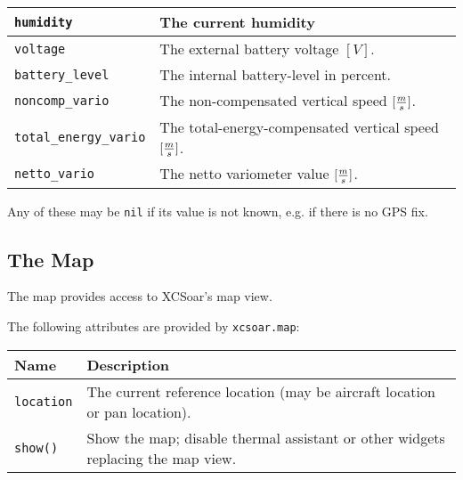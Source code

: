 \begin{maxipage}
\begin{tabularx}{1.9\textwidth}{l|X}
\hline

\verb|humidity| & The current humidity \\

\hline

\verb|voltage| & The external battery voltage
$[{V}]$. \\

\hline

\verb|battery_level| & The internal battery-level in percent. \\

\hline

\verb|noncomp_vario| & The non-compensated vertical speed
$[{m \over s}]$. \\

\hline

\verb|total_energy_vario| & The total-energy-compensated vertical speed
$[{m \over s}]$. \\

\hline

\verb|netto_vario| & The netto variometer value
$[{m \over s}]$. \\

\end{tabularx}
\end{maxipage}

Any of these may be \verb|nil| if its value is not known, e.g. if
there is no GPS fix.

\subsection{The Map}

The map provides access to XCSoar's map view.

The following attributes are provided by \verb|xcsoar.map|:

\begin{maxipage}
\begin{tabularx}{1.9\textwidth}{l|X}
Name & Description \\
\hline\hline

\verb|location| & The current reference location (may be aircraft location or
pan location). \\

\hline

\verb|show()| & Show the map; disable thermal assistant or other
widgets replacing the map view. \\

\end{tabularx}
\end{maxipage}

